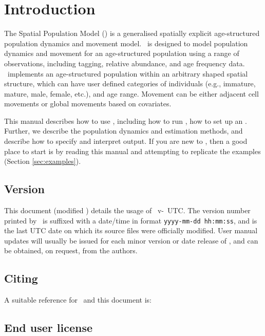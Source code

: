 \section{Introduction\label{sec:Introduction}}

The Spatial Population Model (\SPM) is a generalised spatially explicit age-structured population dynamics and movement model. \SPM\ is designed to model population dynamics and movement for an age-structured population using a range of observations, including tagging, relative abundance, and age frequency data. \SPM\ implements an age-structured population within an arbitrary shaped spatial structure, which can have user defined categories of individuals (e.g., immature, mature, male, female, etc.), and age range. Movement can be either adjacent cell movements or global movements based on covariates. 

This manual describes how to use \SPM, including how to run \SPM, how to set up an \config. Further, we describe the population dynamics and estimation methods, and describe how to specify and interpret output. If you are new to \SPM, then a good place to start is by reading this manual and attempting to replicate the examples (Section \ref{sec:examples}).

\subsection{Version\label{sec:version}}

This document (modified \DocVer) details the usage of \SPM\ v\VER-\SourceControlTimeSPM\ UTC. The version number printed by \SPM\ is suffixed with a date/time in format \texttt{yyyy-mm-dd hh:mm:ss}, and is the last UTC date on which its source files were officially modified. User manual updates will usually be issued for each minor version or date release of \SPM, and can be obtained, on request, from the authors.

\subsection{Citing \SPM}

A suitable reference for \SPM\ and this document is: 

\ManualRef

\subsection{End user license}

